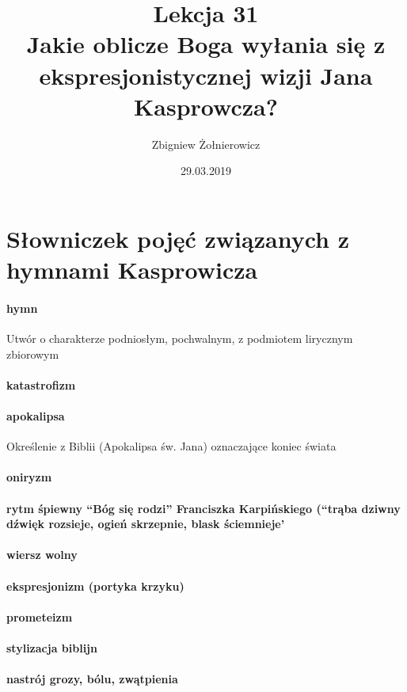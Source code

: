 \documentclass{article}
\begin{document}
\title{
        {\huge Lekcja 31} \\
        {\large Jakie oblicze Boga wyłania się z ekspresjonistycznej wizji Jana Kasprowcza?}
}
\author{Zbigniew Żołnierowicz}
\date{29.03.2019}
\maketitle
\section{Słowniczek pojęć związanych z hymnami Kasprowicza}
    \paragraph*{hymn}
    Utwór o charakterze podniosłym, pochwalnym, z podmiotem lirycznym zbiorowym
    \paragraph*{katastrofizm}
    \paragraph*{apokalipsa}
    Określenie z Biblii (Apokalipsa św. Jana) oznaczające koniec świata
    \paragraph*{oniryzm}
    \paragraph*{rytm śpiewny ``Bóg się rodzi'' Franciszka Karpińskiego  (``trąba dziwny dźwięk rozsieje, ogień skrzepnie, blask ściemnieje'}
    \paragraph*{wiersz wolny}
    \paragraph*{ekspresjonizm (portyka krzyku)}
    \paragraph*{prometeizm}
    \paragraph*{stylizacja biblijn}
    \paragraph*{nastrój grozy, bólu, zwątpienia}
\end{document}
